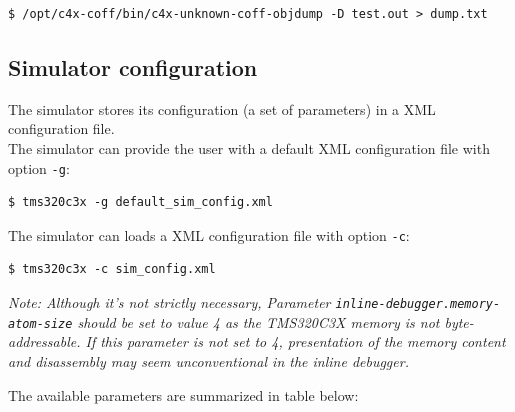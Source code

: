 \begin{verbatim}
$ /opt/c4x-coff/bin/c4x-unknown-coff-objdump -D test.out > dump.txt
\end{verbatim}

\subsection{Simulator configuration}
\label{tms320c3x_configuration}

\noindent The simulator stores its configuration (a set of parameters) in a XML configuration file. 
\newline\\
\noindent The simulator can provide the user with a default XML configuration file with option \texttt{-g}:

\begin{verbatim}
$ tms320c3x -g default_sim_config.xml
\end{verbatim}

\noindent The simulator can loads a XML configuration file with option \texttt{-c}:

\begin{verbatim}
$ tms320c3x -c sim_config.xml
\end{verbatim}

\noindent \textit{Note: Although it's not strictly necessary, Parameter \texttt{inline-debugger.memory-atom-size} should be set to value 4 as the TMS320C3X memory is not byte-addressable. If this parameter is not set to 4, presentation of the memory content and disassembly may seem unconventional in the inline debugger.}

\noindent The available parameters are summarized in table below:

